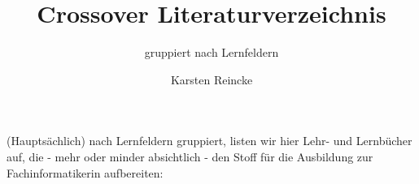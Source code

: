 \documentclass[
  DIV=calc,
  BCOR=5mm,
  11pt,
  headings=small,
  oneside,
  abstract=true,
  toc=bib,
  english,ngerman]{scrartcl}
\def\cfgGl{../../cfg.gl/}
\begin{document}

\nocite{*}

\titlehead{Ausbildung zur Fachinformatikerin}
\subject{Release }
\title{Crossover Literaturverzeichnis}

\subtitle{gruppiert nach Lernfeldern}
\author{Karsten Reincke}

\maketitle

(Hauptsächlich) nach Lernfeldern gruppiert, listen wir hier Lehr- und Lernbücher auf, die - mehr oder minder absichtlich - den Stoff für die Ausbildung zur Fachinformatikerin aufbereiten:
\end{document}
